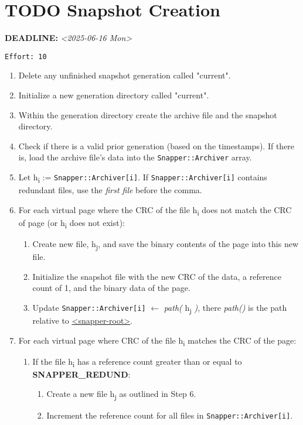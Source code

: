\documentclass[11pt]{article}
\begin{document}
\section{{\bfseries\sffamily TODO}  Snapshot Creation}
\label{sec:org306c947}
\noindent\textbf{DEADLINE:} \textit{<2025-06-16 Mon>}\\
\begin{verbatim}
Effort: 10
\end{verbatim}
\begin{enumerate}
\item Delete any unfinished snapshot generation called "current".
\item Initialize a new generation directory called "current".
\item Within the generation directory create the archive file and the snapshot directory.
\item Check if there is a valid prior generation (based on the timestamps). If there is, load the archive file's data into the \texttt{Snapper::Archiver} array.
\item Let h\textsubscript{i} := \texttt{Snapper::Archiver[i]}. If \texttt{Snapper::Archiver[i]} contains redundant files, use the \emph{first file} before the comma.
\item For each virtual page where the CRC of the file h\textsubscript{i} does not match the CRC of page (or h\textsubscript{i} does not exist):
\begin{enumerate}
\item Create new file, h\textsubscript{j}, and save the binary contents of the page into this new file.
\item Initialize the snapshot file with the new CRC of the data, a reference count of 1, and the binary data of the page.
\item Update \texttt{Snapper::Archiver[i]} \(\gets\) \emph{path(} h\textsubscript{j} \emph{)}, there \emph{path()} is the path relative to \uline{<snapper-root>}.
\end{enumerate}
\item For each virtual page where CRC of the file h\textsubscript{i} matches the CRC of the page:
\begin{enumerate}
\item If the file h\textsubscript{i} has a reference count greater than or equal to \textbf{SNAPPER\_REDUND}:
\begin{enumerate}
\item Create a new file h\textsubscript{j} as outlined in Step 6.
\item Increment the reference count for all files in \texttt{Snapper::Archiver[i]}.

\end{enumerate}
\end{enumerate}
\end{enumerate}
\end{document}
